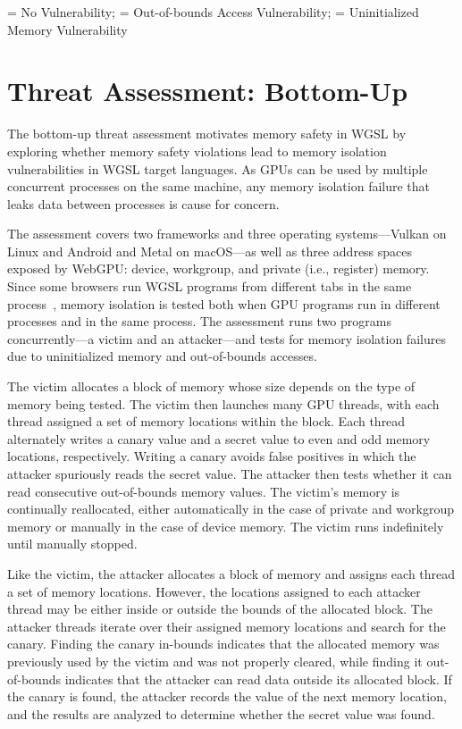\begin{table}
\smallskip
\cmark = No Vulnerability; \oob = Out-of-bounds Access Vulnerability; \uninit = Uninitialized Memory Vulnerability
\label{tab:saferace-study-results}
\end{table}

\section{Threat Assessment: Bottom-Up \label{sec:saferace-assess-bu}}

The bottom-up threat assessment motivates memory safety in WGSL by exploring whether memory safety violations lead to memory isolation vulnerabilities in WGSL target languages. As GPUs can be used by multiple concurrent processes on the same machine, any memory isolation failure that leaks data between processes is cause for concern.

The assessment covers two frameworks and three operating systems---Vulkan on Linux and Android and Metal on macOS---as well as three address spaces exposed by WebGPU: device, workgroup, and private (i.e., register) memory. Since some browsers run WGSL programs from different tabs in the same process~\cite{chromium_webgpu_technical_report}, memory isolation is tested both when GPU programs run in different processes and in the same process. The assessment runs two programs concurrently---a victim and an attacker---and tests for memory isolation failures due to uninitialized memory and out-of-bounds accesses.

The victim allocates a block of memory whose size depends on the type of memory being tested. The victim then launches many GPU threads, with each thread assigned a set of memory locations within the block. Each thread alternately writes a canary value and a secret value to even and odd memory locations, respectively. Writing a canary avoids false positives in which the attacker spuriously reads the secret value. The attacker then tests whether it can read consecutive out-of-bounds memory values. The victim's memory is continually reallocated, either automatically in the case of private and workgroup memory or manually in the case of device memory. The victim runs indefinitely until manually stopped.

Like the victim, the attacker allocates a block of memory and assigns each thread a set of memory locations. However, the locations assigned to each attacker thread may be either inside or outside the bounds of the allocated block. The attacker threads iterate over their assigned memory locations and search for the canary. Finding the canary in-bounds indicates that the allocated memory was previously used by the victim and was not properly cleared, while finding it out-of-bounds indicates that the attacker can read data outside its allocated block. If the canary is found, the attacker records the value of the next memory location, and the results are analyzed to determine whether the secret value was found.

